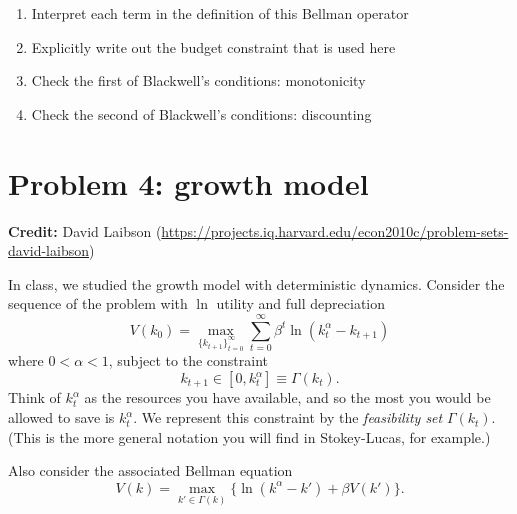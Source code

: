 \documentclass[11pt]{extarticle}
\theoremstyle{plain}
\theoremstyle{definition}
\begin{document}
\vspace{5mm}
\noindent
\begin{enumerate}
\item Interpret each term in the definition of this Bellman operator

\item Explicitly write out the budget constraint that is used here

\item Check the first of Blackwell's conditions: monotonicity

\item Check the second of Blackwell's conditions: discounting
\end{enumerate}





\vspace{10mm}
\section*{Problem 4: growth model}

\textbf{Credit:} David Laibson (\url{https://projects.iq.harvard.edu/econ2010c/problem-sets-david-laibson})

\vspace{5mm}
\noindent
In class, we studied the growth model with deterministic dynamics. Consider the sequence of the problem with $\ln$ utility and full depreciation
\begin{equation*}
	V(k_0) = \max_{ \{ k_{t+1} \}_{t=0}^\infty} \sum_{t=0}^\infty \beta^t \ln (k_t^\alpha - k_{t+1})
\end{equation*}
where $0 < \alpha < 1$, subject to the constraint
\begin{equation*}
	k_{t+1} \in [0, k_t^\alpha] \equiv \Gamma(k_t).
\end{equation*}
Think of $k_t^\alpha$ as the resources you have available, and so the most you would be allowed to save is $k_t^\alpha$. We represent this constraint by the \textit{feasibility set} $\Gamma(k_t)$. (This is the more general notation you will find in Stokey-Lucas, for example.)

Also consider the associated Bellman equation 
\begin{equation*}
	V(k) = \max_{k' \in \Gamma(k)} \bigg\{ \ln (k^\alpha - k') + \beta V(k') \bigg\}.
\end{equation*}
\end{document}
